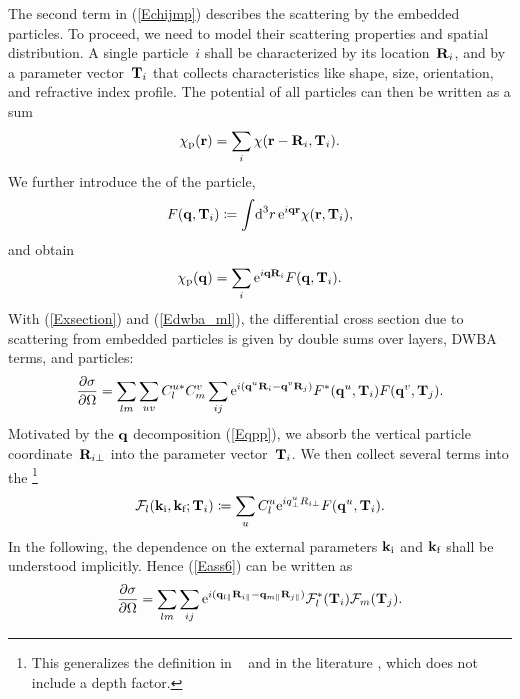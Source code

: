 The second term in (\ref{Echijmp}) describes the scattering
by the embedded particles.
To proceed, we need to model their scattering properties
and spatial distribution.
A single particle~$i$ shall be characterized by its location~$\mathbf{R}_i$,
and by a parameter vector~$\mathbf{T}_i$ that collects
characteristics like shape, size, orientation, and refractive index profile.
The potential of all particles can then be written as a sum
\begin{equation}
  \chi_\text{p}(\mathbf{r}) = \sum_i \chi(\mathbf{r}-\mathbf{R}_i,\mathbf{T}_i).
\end{equation}
We further introduce the 
%
of the particle,
\begin{equation}
  F(\mathbf{q},\mathbf{T}_i) \coloneqq  \int\!\text{d}^3r\,\text{e}^{i\mathbf{q}\mathbf{r}}\chi(\mathbf{r},\mathbf{T}_i),
\end{equation}
and obtain
\begin{equation}
  \chi_\text{p}(\mathbf{q}) = \sum_i \text{e}^{i\mathbf{q}\mathbf{R}_i} F(\mathbf{q},\mathbf{T}_i).
\end{equation}
With (\ref{Exsection}) and (\ref{Edwba_ml}), 
the differential cross section due to scattering from embedded particles is
given by double sums over layers, DWBA terms, and particles:
\begin{equation}\label{Eass6}
  \frac{\partial\sigma}{\partial\Omega}
  = \sum_{lm} \sum_{uv} C^{u*}_l C^v_m \sum_{ij}
    \text{e}^{i(\mathbf{q}^u \mathbf{R}_i - \mathbf{q}^v \mathbf{R}_j)} F^*(\mathbf{q}^u,\mathbf{T}_i) F(\mathbf{q}^v,\mathbf{T}_j).
\end{equation}
Motivated by the $\mathbf{q}$ decomposition (\ref{Eqpp}),
we absorb the vertical particle coordinate~$\mathbf{R}_{i\perp}$
into the parameter vector~$\mathbf{T}_i$.
We then collect several terms into the \footnote
{This generalizes the definition in \IsGISAXS\ \cite[ch.~2.4.1]{Laz08}
  and in the literature \cite[p.~292]{ReLL09},
which does not include a depth factor.}
\begin{equation}
  \mathcal{F}_l(\mathbf{k}_{\text{i}},\mathbf{k}_{\text{f}};\mathbf{T}_i)
  \coloneqq  \sum_u C^u_l \text{e}^{iq^u_\perp R_{i\perp}} F(\mathbf{q}^u,\mathbf{T}_i).
\end{equation}
In the following, the dependence on the external parameters
$\mathbf{k}_{\text{i}}$ and $\mathbf{k}_{\text{f}}$ shall be understood implicitly.
Hence (\ref{Eass6}) can be written as
\begin{equation}\label{Eass4}
  \frac{\partial\sigma}{\partial\Omega}
  = \sum_{lm} \sum_{ij} \text{e}^{i(\mathbf{q}_{l\parallel}\mathbf{R}_{i\parallel}-\mathbf{q}_{m\parallel}\mathbf{R}_{j\parallel})}
    \mathcal{F}^*_l(\mathbf{T}_i) \mathcal{F}_m(\mathbf{T}_j).
\end{equation}


